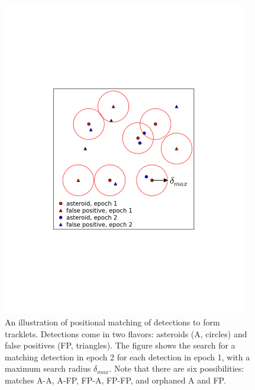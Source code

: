 \begin{figure}[t!]
\centering
\vskip -2.0in
\includegraphics[width=0.95\textwidth]{figures/TrackSlide2}
\vskip -2.2in
\caption{An illustration of positional matching of detections to form tracklets.
Detections come in two flavors: asteroids (A, circles) and false positives (FP, triangles).
The figure shows the search for a matching detection in epoch 2 for each detection
in epoch 1, with a maximum search radius $\delta_{max}$. Note that there are six
possibilities: matches A-A, A-FP, FP-A, FP-FP, and orphaned A and FP.
\label{fig:TrackSlide2}}
\end{figure}

